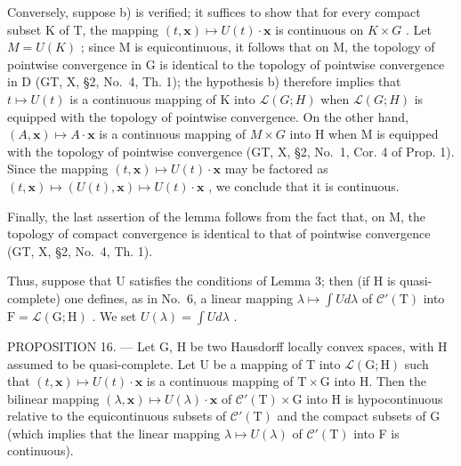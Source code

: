 Conversely, suppose b) is verified; it suffices to show that for every compact subset K of T, the mapping \((t,\mathbf{x})\mapsto U(t)\cdot\mathbf{x}\) is continuous on \(K\times G\) . Let \(M=U(K)\) ; since M is equicontinuous, it follows that on M, the topology of pointwise convergence in G is identical to the topology of pointwise convergence in D (GT, X, §2, No.~4, Th. 1); the hypothesis b) therefore implies that \(t\mapsto U(t)\) is a continuous mapping of K into \(\mathcal{L}(G;H)\) when \(\mathcal{L}(G;H)\) is equipped with the topology of pointwise convergence. On the other hand, \((A,\mathbf{x})\mapsto A\cdot\mathbf{x}\) is a continuous mapping of \(M\times G\) into H when M is equipped with the topology of pointwise convergence (GT, X, §2, No.~1, Cor. 4 of Prop. 1). Since the mapping \((t,\mathbf{x})\mapsto U(t)\cdot\mathbf{x}\) may be factored as \((t,\mathbf{x})\mapsto(U(t),\mathbf{x})\mapsto U(t)\cdot\mathbf{x}\) , we conclude that it is continuous.

Finally, the last assertion of the lemma follows from the fact that, on M, the topology of compact convergence is identical to that of pointwise convergence (GT, X, §2, No.~4, Th. 1).

Thus, suppose that U satisfies the conditions of Lemma 3; then (if H is quasi-complete) one defines, as in No.~6, a linear mapping \(\lambda \mapsto \int U d\lambda\) of \(\mathcal{C}'(\mathrm{T})\) into \(\mathrm{F} = \mathcal{L}(\mathrm{G}; \mathrm{H})\) . We set \(U(\lambda) = \int U d\lambda\) .

PROPOSITION 16. --- Let G, H be two Hausdorff locally convex spaces, with H assumed to be quasi-complete. Let U be a mapping of T into \(\mathcal{L}(\mathrm{G};\mathrm{H})\) such that \((t,\mathbf{x})\mapsto U(t)\cdot \mathbf{x}\) is a continuous mapping of \(\mathrm{T}\times \mathrm{G}\) into H. Then the bilinear mapping \((\lambda ,\mathbf{x})\mapsto U(\lambda)\cdot \mathbf{x}\) of \(\mathcal{C}'(\mathrm{T})\times \mathrm{G}\) into H is hypocontinuous relative to the equicontinuous subsets of \(\mathcal{C}'(\mathrm{T})\) and the compact subsets of G (which implies that the linear mapping \(\lambda \mapsto U(\lambda)\) of \(\mathcal{C}'(\mathrm{T})\) into F is continuous).


